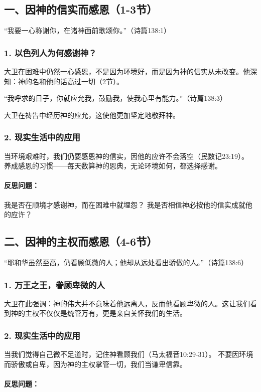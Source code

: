 \documentclass[a4paper, 12pt]{article}
\begin{document}
\subsection*{一、因神的信实而感恩（1-3节）}
“我要一心称谢你，在诸神面前歌颂你。”（诗篇138:1）

\subsubsection*{1. 以色列人为何感谢神？}
\hspace{0.6cm}大卫在困难中仍然一心感恩，不是因为环境好，而是因为神的信实从未改变。他深知：神的名和他的话高过一切（2节）。

“我呼求的日子，你就应允我，鼓励我，使我心里有能力。”（诗篇138:3）

大卫在祷告中经历神的应允，这使他更加坚定地敬拜神。

\subsubsection*{2. 现实生活中的应用}
当环境艰难时，我们仍要感恩神的信实，因他的应许不会落空（民数记23:19）。
养成感恩的习惯——每天数算神的恩典，无论环境如何，都选择感谢。
\paragraph*{反思问题：}

我是否在顺境才感谢神，而在困难中就埋怨？
我是否相信神必按他的信实成就他的应许？
\subsection*{二、因神的主权而感恩（4-6节）}
“耶和华虽然至高，仍看顾低微的人；他却从远处看出骄傲的人。”（诗篇138:6）

\subsubsection*{1. 万王之王，眷顾卑微的人}
大卫在此强调：神的伟大并不意味着他远离人，反而他看顾卑微的人。这让我们看到神的主权不仅仅是统管万有，更是亲自关怀我们的生活。

\subsubsection*{2. 现实生活中的应用}
当我们觉得自己微不足道时，记住神看顾我们（马太福音10:29-31）。
不要因环境而骄傲或自卑，因为神的主权掌管一切，我们当谦卑信靠。
\paragraph*{反思问题：}
\end{document}
